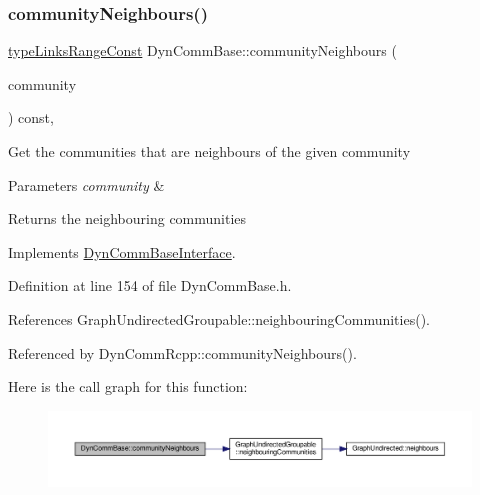 \subsubsection{\texorpdfstring{community\+Neighbours()}{communityNeighbours()}}
{\footnotesize\ttfamily \hyperlink{graphInterface_8h_ae8d27008f15586bbf419af7ad2e0a48a}{type\+Links\+Range\+Const} Dyn\+Comm\+Base\+::community\+Neighbours (\begin{DoxyParamCaption}\item[{\hyperlink{graphUndirectedGroupable_8h_a914da95c9ea7f14f4b7f875c36818556}{type\+Community}}]{community }\end{DoxyParamCaption}) const\hspace{0.3cm}{\ttfamily [inline]}, {\ttfamily [virtual]}}

Get the communities that are neighbours of the given community


\begin{DoxyParams}{Parameters}
{\em community} & \\
\hline
\end{DoxyParams}
\begin{DoxyReturn}{Returns}
the neighbouring communities 
\end{DoxyReturn}


Implements \hyperlink{classDynCommBaseInterface_afbae10b36098f57576378255d9c09faf}{Dyn\+Comm\+Base\+Interface}.



Definition at line 154 of file Dyn\+Comm\+Base.\+h.



References Graph\+Undirected\+Groupable\+::neighbouring\+Communities().



Referenced by Dyn\+Comm\+Rcpp\+::community\+Neighbours().

Here is the call graph for this function\+:
\nopagebreak
\begin{figure}[H]
\begin{center}
\leavevmode
\includegraphics[width=350pt]{classDynCommBase_aba6f1f0fdd67a1d7f546d63706a60cde_cgraph}
\end{center}
\end{figure}
\mbox{\label{classDynCommBase_a9e7f2493dd9f2381dbfbe94b91ac49f4}} 
